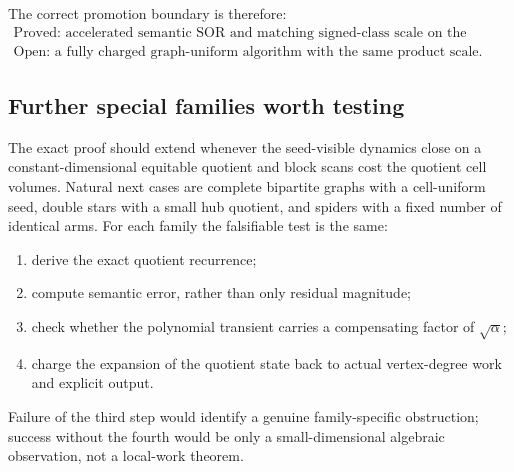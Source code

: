 The correct promotion boundary is therefore:
\begin{equation}
  \boxed{
  \begin{array}{l}
  \text{Proved: accelerated semantic SOR and matching signed-class scale on
  the center-star.}\\[2pt]
  \text{Open: a fully charged graph-uniform algorithm with the same product
  scale.}
  \end{array}}
  \label{eq:signed-star-promotion-boundary}
\end{equation}

\subsection{Further special families worth testing}

The exact proof should extend whenever the seed-visible dynamics close on a
constant-dimensional equitable quotient and block scans cost the quotient
cell volumes.  Natural next cases are complete bipartite graphs with a
cell-uniform seed, double stars with a small hub quotient, and spiders with a
fixed number of identical arms.  For each family the falsifiable test is the
same:
\begin{enumerate}[leftmargin=*]
\item derive the exact quotient recurrence;
\item compute semantic error, rather than only residual magnitude;
\item check whether the polynomial transient carries a compensating factor of
      $\sqrt\alpha$;
\item charge the expansion of the quotient state back to actual vertex-degree
      work and explicit output.
\end{enumerate}
Failure of the third step would identify a genuine family-specific
obstruction; success without the fourth would be only a small-dimensional
algebraic observation, not a local-work theorem.
